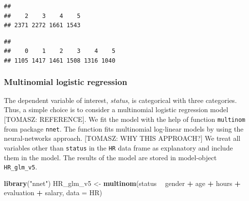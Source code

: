 \documentclass[12pt,]{krantz}
\newenvironment{Shaded}{\begin{snugshade}}{\end{snugshade}}
\newcommand{\DataTypeTok}[1]{\textcolor[rgb]{0.13,0.29,0.53}{#1}}
\newcommand{\KeywordTok}[1]{\textcolor[rgb]{0.13,0.29,0.53}{\textbf{#1}}}
\newcommand{\NormalTok}[1]{#1}
\newcommand{\OperatorTok}[1]{\textcolor[rgb]{0.81,0.36,0.00}{\textbf{#1}}}
\newcommand{\StringTok}[1]{\textcolor[rgb]{0.31,0.60,0.02}{#1}}
\theoremstyle{definition}
\theoremstyle{definition}
\theoremstyle{definition}
\theoremstyle{remark}
\begin{document}
\begin{Shaded}
\end{Shaded}

\begin{verbatim}
## 
##    2    3    4    5 
## 2371 2272 1661 1543
\end{verbatim}

\begin{Shaded}
\end{Shaded}

\begin{verbatim}
## 
##    0    1    2    3    4    5 
## 1105 1417 1461 1508 1316 1040
\end{verbatim}

\hypertarget{model_HR_mr}{%
\subsubsection{Multinomial logistic regression}\label{model_HR_mr}}

The dependent variable of interest, \emph{status}, is categorical with
three categories. Thus, a simple choice is to consider a multinomial
logistic regression model {[}TOMASZ: REFERENCE{]}. We fit the model with
the help of function \texttt{multinom} from package \texttt{nnet}. The
function fits multinomial log-linear models by using the neural-networks
approach. {[}TOMASZ: WHY THIS APPROACH?{]} We treat all variables other
than \texttt{status} in the \texttt{HR} data frame as explanatory and
include them in the model. The results of the model are stored in
model-object \texttt{HR\_glm\_v5}.

\begin{Shaded}
\begin{Highlighting}[]
\KeywordTok{library}\NormalTok{(}\StringTok{"nnet"}\NormalTok{)}
\NormalTok{HR_glm_v5 <-}\StringTok{ }\KeywordTok{multinom}\NormalTok{(status }\OperatorTok{~}\StringTok{ }\NormalTok{gender }\OperatorTok{+}\StringTok{ }\NormalTok{age }\OperatorTok{+}\StringTok{ }\NormalTok{hours }\OperatorTok{+}\StringTok{ }\NormalTok{evaluation }\OperatorTok{+}\StringTok{ }\NormalTok{salary, }\DataTypeTok{data =}\NormalTok{ HR)}
\end{Highlighting}
\end{Shaded}
\end{document}
